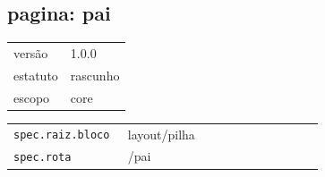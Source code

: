 \subsection*{pagina: pai}
\begin{tabular}{@{}ll@{}}
versão & 1.0.0 \\
estatuto & rascunho \\
escopo & core \\
\end{tabular}

\begin{tabular}{@{}p{0.35\linewidth}p{0.6\linewidth}@{}}
\texttt{spec.raiz.bloco} & layout/pilha \\
\texttt{spec.rota} & /pai \\
\end{tabular}
